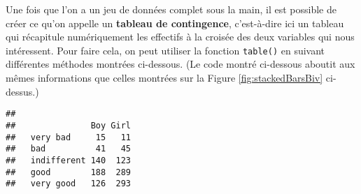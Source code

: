 \documentclass[
  french,
]{book}
\newenvironment{Shaded}{\begin{snugshade}}{\end{snugshade}}
\newcommand{\CommentTok}[1]{\textcolor[rgb]{0.56,0.35,0.01}{\textit{#1}}}
\newcommand{\DataTypeTok}[1]{\textcolor[rgb]{0.13,0.29,0.53}{#1}}
\newcommand{\KeywordTok}[1]{\textcolor[rgb]{0.13,0.29,0.53}{\textbf{#1}}}
\newcommand{\NormalTok}[1]{#1}
\newcommand{\OperatorTok}[1]{\textcolor[rgb]{0.81,0.36,0.00}{\textbf{#1}}}
\newcommand{\StringTok}[1]{\textcolor[rgb]{0.31,0.60,0.02}{#1}}
\begin{document}
\begin{Shaded}
\end{Shaded}

Une fois que l'on a un jeu de données complet sous la main, il est possible de créer ce qu'on appelle un \textbf{tableau de contingence}, c'est-à-dire ici un tableau qui récapitule numériquement les effectifs à la croisée des deux variables qui nous intéressent. Pour faire cela, on peut utiliser la fonction \texttt{table()} en suivant différentes méthodes montrées ci-dessous. (Le code montré ci-dessous aboutit aux mêmes informations que celles montrées sur la Figure \ref{fig:stackedBarsBiv} ci-dessus.)

\begin{Shaded}
\end{Shaded}

\begin{verbatim}
##              
##               Boy Girl
##   very bad     15   11
##   bad          41   45
##   indifferent 140  123
##   good        188  289
##   very good   126  293
\end{verbatim}
\end{document}
